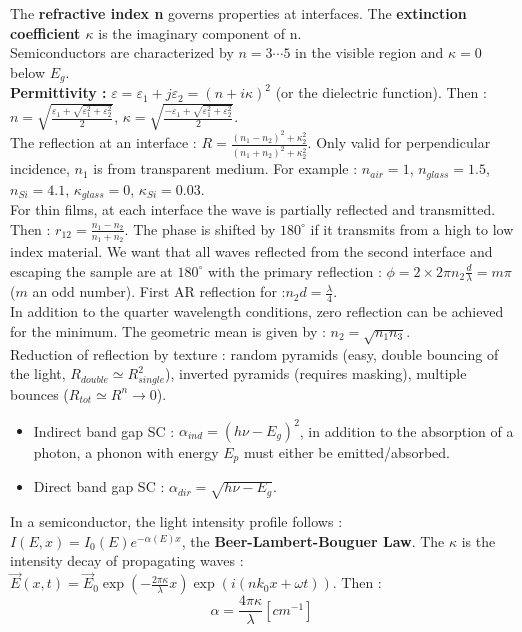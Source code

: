 \documentclass[../main.tex]{subfiles}
\begin{document}
The \textbf{refractive index n} governs properties at interfaces. The \textbf{extinction coefficient $\kappa$} is the imaginary component of n. \\
Semiconductors are characterized by $n=3 \cdots 5$ in the visible region and $\kappa =0$ below $E_g$. \\
\textbf{Permittivity :} $\varepsilon = \varepsilon_1 + j \varepsilon_2 = (n+i\kappa)^2$ (or the dielectric function). Then : $n = \sqrt{\frac{\varepsilon_1 + \sqrt{\varepsilon_1^2+\varepsilon_2^2}}{2}}$, $\kappa = \sqrt{\frac{-\varepsilon_1 + \sqrt{\varepsilon_1^2+\varepsilon_2^2}}{2}}$.\\

The reflection at an interface : $R = \frac{(n_1-n_2)^2+\kappa_2^2}{(n_1+n_2)^2+\kappa_2^2}$. \warning Only valid for perpendicular incidence, $n_1$ is from transparent medium. For example : $n_{air}=1$, $n_{glass} = 1.5$, $n_{Si} = 4.1$, $\kappa_{glass} = 0$, $\kappa_{Si} = 0.03$.\\
For thin films, at each interface the wave is partially reflected and transmitted. Then : $r_{12} = \frac{n_1-n_2}{n_1+n_2}$. The phase is shifted by $180^\circ$ if it transmits from a high to low index material. We want that all waves reflected from the second interface and escaping the sample are at $180^\circ$ with the primary reflection : $\phi = 2\times 2 \pi n_2 \frac{d}{\lambda} = m\pi$ ($m$ an odd number). First AR reflection for :$n_2d = \frac{\lambda}{4}$.\\
In addition to the quarter wavelength conditions, zero reflection can be achieved for the minimum. The geometric mean is given by : $n_2 = \sqrt{n_1 n_3}$.\\

Reduction of reflection by texture : random pyramids (easy, double bouncing of the light, $R_{double} \simeq R_{single}^2$), inverted pyramids (requires masking), multiple bounces ($R_{tot} \simeq R^n \rightarrow 0$).\\
\begin{itemize}
    \item Indirect band gap SC : $\alpha_{ind} = (h\nu -E_g)^2$, in addition to the absorption of a photon, a phonon with energy $E_p$ must either be emitted/absorbed.
    \item Direct band gap SC : $\alpha_{dir} = \sqrt{h\nu-E_g}$.
\end{itemize}

In a semiconductor, the light intensity profile follows : $I(E,x) = I_0(E) e^{-\alpha(E) x}$, the \textbf{Beer-Lambert-Bouguer Law}. The $\kappa$ is the intensity decay of propagating waves : $\vec{E}(x,t) = \vec{E}_0 \exp(-\frac{2\pi \kappa}{\lambda} x) \exp(i(nk_0 x+\omega t))$. Then : \begin{equation}
    \alpha = \frac{4\pi \kappa}{\lambda} [cm^{-1}]
\end{equation}
\end{document}
